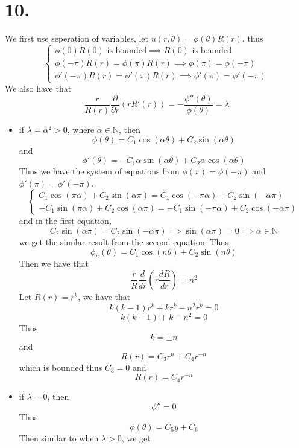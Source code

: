 \documentclass[11pt]{article}
\theoremstyle{mystyle}
\theoremstyle{definition}
\begin{document}
\section*{10.}
We first use seperation of variables, let $u(r, \theta) = \phi(\theta) R(r)$, thus 
\[
  \begin{cases}
    \phi(0) R(0) \text{ is bounded} \implies R(0) \text{ is bounded} \\
    \phi(-\pi)R(r) = \phi(\pi) R(r) \implies \phi(\pi) = \phi(-\pi) \\ 
    \phi'(-\pi)R(r) = \phi'(\pi) R(r) \implies \phi'(\pi) = \phi'(-\pi)
  \end{cases}
\]
We also have that 
\[
  \displaystyle\frac{r}{R(r)} \displaystyle\frac{\partial }{\partial r}(r R'(r)) = -\displaystyle\frac{\phi''(\theta)}{\phi(\theta)} = \lambda
\]
\begin{itemize}
  \item if $\lambda = \alpha^2 > 0$, where $\alpha \in \mathbb{N}$, then 
    \[
      \phi(\theta) = C_1 \cos(\alpha \theta) + C_2 \sin(\alpha \theta)
    \]
    and 
    \[
      \phi'(\theta) = -C_1 \alpha \sin(\alpha \theta) + C_2\alpha  \cos(\alpha \theta)
    \]
    Thus we have the system of equations from $\phi(\pi) = \phi(-\pi)$ and $\phi'(\pi) = \phi'(-\pi)$. 
    \[
      \begin{cases}
        C_1 \cos(\pi \alpha) + C_2 \sin(\alpha \pi) = C_1 \cos(-\pi \alpha) + C_2 \sin(-\alpha \pi)\\
        -C_1 \sin(\pi \alpha) + C_2 \cos(\alpha \pi) = -C_1 \sin(-\pi \alpha) + C_2 \cos(-\alpha \pi)
      \end{cases}
    \]
    and in the first equation,  
    \[
      C_2 \sin(\alpha \pi) = C_2 \sin(-\alpha \pi) \implies \sin(\alpha \pi) = 0 \implies \alpha \in \mathbb{N}
    \]
    we get the similar result from the second equation. Thus 
    \[
      \phi_n(\theta) = C_1 \cos(n\theta) + C_2 \sin(n\theta)
    \]
    Then we have that 
    \[
      \displaystyle\frac{r}{R} \displaystyle\frac{d}{dr} \left(r \displaystyle\frac{dR}{dr}\right) = n^2
    \]
    Let $R(r) = r^k$, we have that 
    \[
      k(k-1)r^k + kr^k - n^2r^k = 0
    \]
    \[
      k(k-1) +k -n^2 = 0
    \]
    Thus 
    \[
      k = \pm n
    \]
    and 
    \[
      R(r) = C_3 r^n + C_4 r^{-n}
    \]
    which is bounded thus $C_3 = 0$ and 
    \[
      R(r) = C_4 r^{-n}
    \]
  \item if $\lambda = 0$, then 
    \[
      \phi'' = 0
    \]
    Thus 
    \[
      \phi(\theta) = C_5 y + C_6
    \]
    Then similar to when $\lambda>0$, we get 

\end{itemize}
\end{document}
